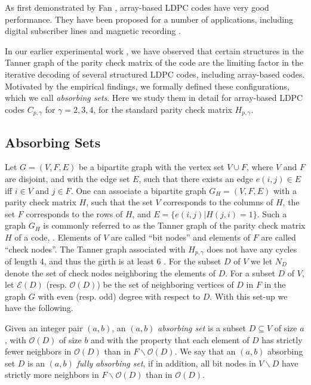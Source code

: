 As first demonstrated by Fan \cite{fan}, array-based LDPC codes
have very good performance. They have been proposed for a number
of applications, including digital subscriber lines \cite{ibm:02}
and magnetic recording  \cite{vasic:05}.




In our earlier experimental work \cite{zhang06}, we have observed
that certain structures in the Tanner graph of the parity check
matrix of the code are the limiting factor in the iterative
decoding of several structured LDPC codes, including array-based
codes. Motivated by the empirical findings, we formally defined
these configurations, which we call \emph{absorbing sets}. Here we
study them in detail for array-based LDPC codes $C_{p,\gamma}$ for
$\gamma=2,3,4$, for the standard parity check matrix
$H_{p,\gamma}$.


\subsection{Absorbing Sets}

Let $G=(V,F,E)$ be a bipartite graph with the vertex set $V \cup
F$, where $V$ and $F$ are disjoint, and with the edge set $E$,
such that there exists an edge $e(i,j) \in E$ iff $i\in V$ and
$j\in F$. One can associate a bipartite graph $G_H=(V,F,E)$ with a
parity check matrix $H$, such that the set $V$ corresponds to the
columns of $H$, the set $F$ corresponds to the rows of $H$, and
$E=\{ e(i,j)| H(j,i)=1\}$. Such a graph $G_H$ is commonly referred
to as the Tanner graph of the parity check matrix $H$ of a code,
\cite{forney}. Elements of $V$ are called ``bit nodes'' and
elements of $F$ are called ``check nodes''. The Tanner graph
associated with $H_{p,\gamma}$ does not have any cycles of length
4, and thus the girth is at least 6 \cite{fan}. For the subset $D$
of $V$ we let $N_D$ denote the set of check nodes neighboring the
elements of $D$. For a subset $D$ of $V$, let $\mathcal{E}(D)$
(resp. $\mathcal{O}(D)$) be the set of neighboring vertices of $D$
in $F$ in the graph $G$ with even (resp. odd) degree with respect
to $D$. With this set-up we have the following.

\begin{definition}  Given an integer pair $(a,b)$, an $(a,b)$ \emph{absorbing
set} is a subset $D \subseteq V$ of size $a$, with
$\mathcal{O}(D)$ of size $b$ and with the property that each
element of $D$ has strictly fewer neighbors in $\mathcal{O}(D)$
than in $F\backslash \mathcal{O}(D)$. We say that an $(a,b)$
absorbing set $D$ is an $(a,b)$ \emph{fully absorbing set}, if in
addition, all bit nodes in $V\backslash D$ have strictly more
neighbors in $F\backslash \mathcal{O}(D)$ than in
$\mathcal{O}(D)$.\end{definition}

